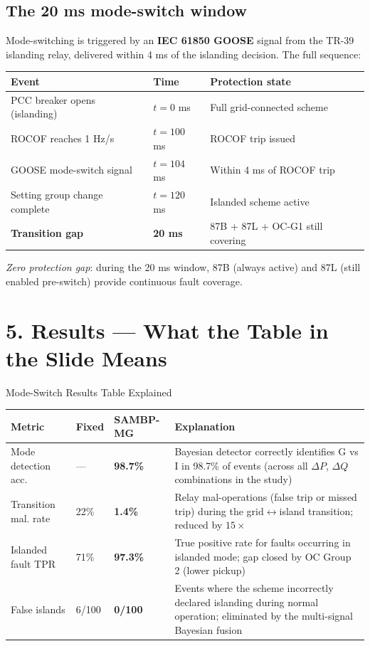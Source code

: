 \documentclass[12pt,a4paper]{article}
\begin{document}
\subsection{The 20 ms mode-switch window}

Mode-switching is triggered by an \textbf{IEC 61850 GOOSE} signal from the TR-39
islanding relay, delivered within 4 ms of the islanding decision. The full sequence:

\begin{center}
\begin{tabular}{@{}lll@{}}
\toprule
\textbf{Event} & \textbf{Time} & \textbf{Protection state}\\
\midrule
PCC breaker opens (islanding) & $t = 0$ ms & Full grid-connected scheme\\
ROCOF reaches 1 Hz/s & $t = 100$ ms & ROCOF trip issued\\
GOOSE mode-switch signal & $t = 104$ ms & Within 4 ms of ROCOF trip\\
Setting group change complete & $t = 120$ ms & Islanded scheme active\\
\midrule
\textbf{Transition gap} & \textbf{20 ms} & 87B + 87L + OC-G1 still covering\\
\bottomrule
\end{tabular}
\end{center}

\textit{Zero protection gap}: during the 20 ms window, 87B (always active) and
87L (still enabled pre-switch) provide continuous fault coverage.

\section{5.\; Results — What the Table in the Slide Means}

\begin{resultbox}{Mode-Switch Results Table Explained}
\begin{tabular}{@{}lp{3.5cm}p{3.5cm}p{4cm}@{}}
\toprule
\textbf{Metric} & \textbf{Fixed} & \textbf{SAMBP-MG} & \textbf{Explanation}\\
\midrule
Mode detection acc. & --- & \textbf{98.7\%} &
  Bayesian detector correctly identifies G vs I in 98.7\% of events
  (across all $\Delta P$, $\Delta Q$ combinations in the study)\\[4pt]
Transition mal. rate & 22\% & \textbf{1.4\%} &
  Relay mal-operations (false trip or missed trip) during the
  grid$\leftrightarrow$island transition; reduced by $15\times$\\[4pt]
Islanded fault TPR & 71\% & \textbf{97.3\%} &
  True positive rate for faults occurring in islanded mode;
  gap closed by OC Group 2 (lower pickup)\\[4pt]
False islands & 6/100 & \textbf{0/100} &
  Events where the scheme incorrectly declared islanding during
  normal operation; eliminated by the multi-signal Bayesian fusion\\
\bottomrule
\end{tabular}
\end{resultbox}
\end{document}
